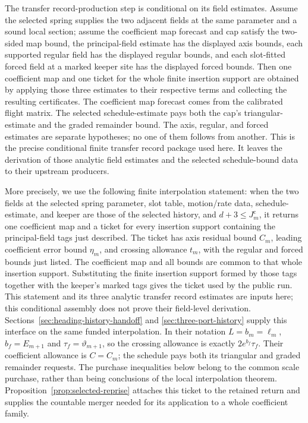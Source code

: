 The transfer record-production step is conditional on its field estimates. Assume the selected spring supplies the two adjacent fields at the same parameter and a sound local section; assume the coefficient map forecast and cap satisfy the two-sided map bound, the principal-field estimate has the displayed axis bounds, each supported regular field has the displayed regular bounds, and each slot-fitted forced field at a marked keeper site has the displayed forced bounds. Then one coefficient map and one ticket for the whole finite insertion support are obtained by applying those three estimates to their respective terms and collecting the resulting certificates. The coefficient map forecast comes from the calibrated flight matrix. The selected schedule-estimate pays both the cap's triangular-estimate and the graded remainder bound. The axis, regular, and forced estimates are separate hypotheses; no one of them follows from another. This is the precise conditional finite transfer record package used here. It leaves the derivation of those analytic field estimates and the selected schedule-bound data to their upstream producers.

More precisely, we use the following finite interpolation statement: when the two fields at the selected spring parameter, slot table, motion/rate data, schedule-estimate, and keeper are those of the selected history, and $d+3\leq J_m^{\mathrm c}$, it returns one coefficient map and a ticket for every insertion support containing the principal-field tags just described. The ticket has axis residual bound $C_m$, leading coefficient error bound $\eta_m$, and crossing allowance $t_m$, with the regular and forced bounds just listed. The coefficient map and all bounds are common to that whole insertion support. Substituting the finite insertion support formed by those tags together with the keeper's marked tags gives the ticket used by the public run. This statement and its three analytic transfer record estimates are inputs here; this conditional assembly does not prove their field-level derivation. Sections~\ref{sec:heading-history-handoff} and
\ref{sec:three-port-history} supply this interface on the same
funded interpolation. In their notation $L=b_m=\ell_m$,
$b_f=E_{m+1}$ and $\tau_f=\vartheta_{m+1}$, so the crossing
allowance is exactly $2e^{b_f}\tau_f$. Their coefficient allowance
is $C=C_m$; the schedule pays both its triangular and graded
remainder requests. The purchase inequalities below belong to the
common scale purchase, rather than being conclusions of the local
interpolation theorem. Proposition~\ref{prop:selected-reprise}
attaches this ticket to the retained return and supplies the
countable merger needed for its application to a whole coefficient family.

